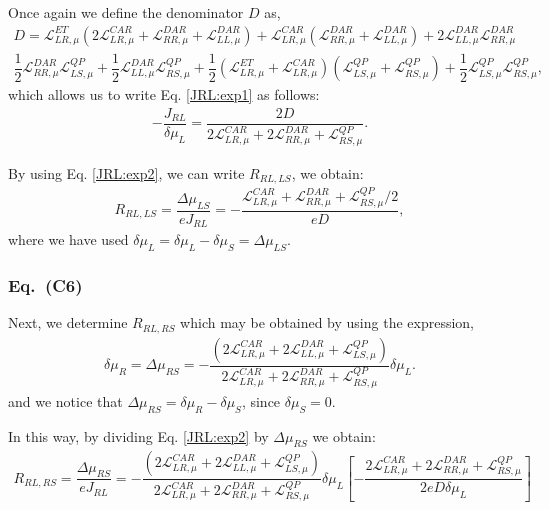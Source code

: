 Once again we define the denominator $D$ as,
\begin{align}\nonumber
D=\mathcal{L}_{LR,\mu}^{ET}
(2\mathcal{L}_{LR,\mu}^{CAR}
+
\mathcal{L}_{RR,\mu}^{DAR}
+
\mathcal{L}_{LL,\mu}^{DAR})
+
\mathcal{L}_{LR,\mu}^{CAR}
(
\mathcal{L}_{RR,\mu}^{DAR}
+
\mathcal{L}_{LL,\mu}^{DAR}
)
+2\mathcal{L}_{LL,\mu}^{DAR}\mathcal{L}_{RR,\mu}^{DAR}
\\\label{D:definition}
\dfrac{1}{2}\mathcal{L}_{RR,\mu}^{DAR}\mathcal{L}^{QP}_{LS,\mu}
+\dfrac{1}{2}
\mathcal{L}_{LL,\mu}^{DAR}\mathcal{L}^{QP}_{RS,\mu}
+\dfrac{1}{2}
(\mathcal{L}_{LR,\mu}^{ET}+\mathcal{L}_{LR,\mu}^{CAR})(\mathcal{L}^{QP}_{LS,\mu}
+
\mathcal{L}^{QP}_{RS,\mu})
+\dfrac{1}{2}
\mathcal{L}^{QP}_{LS,\mu}\mathcal{L}^{QP}_{RS,\mu},
\end{align}
which allows us to write Eq. \eqref{JRL:exp1} as follows:
\begin{align}\label{JRL:exp2}
-\dfrac{J_{RL}}{\delta\mu_{L}}
=
\dfrac{2D}{2\mathcal{L}_{LR,\mu}^{CAR}
+
2\mathcal{L}_{RR,\mu}^{DAR}
+
\mathcal{L}^{QP}_{RS,\mu}}.
\end{align}

By using Eq. \eqref{JRL:exp2}, we can write $R_{RL,LS}$, we obtain:
\begin{align}\label{RRLLS:exp_def}
R_{RL,LS}=\dfrac{\Delta\mu_{LS}}{eJ_{RL}}
=
-\dfrac{\mathcal{L}_{LR,\mu}^{CAR}
+
\mathcal{L}_{RR,\mu}^{DAR}
+
\mathcal{L}^{QP}_{RS,\mu}/2}{eD},
\end{align}
where we have used $\delta\mu_{L}=\delta\mu_{L}-\delta\mu_{S}=\Delta\mu_{LS}$.

\subsubsection{Eq.~(C6)}
Next, we determine $R_{RL,RS}$ which may be obtained by using the expression,
\begin{align*}
\delta\mu_{R}=\Delta\mu_{RS}
=-\dfrac{(2\mathcal{L}_{LR,\mu}^{CAR}+
2\mathcal{L}_{LL,\mu}^{DAR}+
\mathcal{L}^{QP}_{LS,\mu})}{2\mathcal{L}_{LR,\mu}^{CAR}
+
2\mathcal{L}_{RR,\mu}^{DAR}
+
\mathcal{L}^{QP}_{RS,\mu}}\delta\mu_{L}.
\end{align*}
and we notice that $\Delta\mu_{RS}=\delta\mu_{R}-\delta\mu_{S}$, since $\delta\mu_{S}=0$.

In this way, by dividing Eq. \eqref{JRL:exp2} by $\Delta\mu_{RS}$ we obtain:
\begin{align*}
R_{RL,RS}
=
\dfrac{\Delta\mu_{RS}}{eJ_{RL}}
=
-\dfrac{(2\mathcal{L}_{LR,\mu}^{CAR}+
2\mathcal{L}_{LL,\mu}^{DAR}+
\mathcal{L}^{QP}_{LS,\mu})}{2\mathcal{L}_{LR,\mu}^{CAR}
+
2\mathcal{L}_{RR,\mu}^{DAR}
+
\mathcal{L}^{QP}_{RS,\mu}}\delta\mu_{L}\left[-\dfrac{2\mathcal{L}_{LR,\mu}^{CAR}
+
2\mathcal{L}_{RR,\mu}^{DAR}
+
\mathcal{L}^{QP}_{RS,\mu}}{2eD\delta\mu_{L}}\right]
\end{align*}

